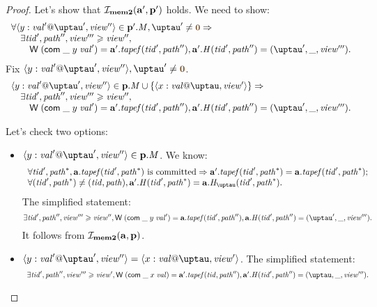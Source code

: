 \begin{proof}
  \noindent
Let's show that $\mathcal{I}_{\rm \bf mem2}(\mathbf{a}', \mathbf{p}')$ holds.
  We need to show:
  \[\begin{array}{l}
  \forall \writeEvt{y}{\stval'}{\tau'}{\R''} \in \p'.\Mprom, \tau' \not = \tstamp{0} => \\
  \quad \exists \tId', \cpath'', \R''' \ge \R'', \\
  \quad \quad \tapeWrite{(\tapeWriteCommitted{\_}{y}{\stval'})} = \aT'.\tapef(\tId', \cpath''),
        \aT'.\hmap(\tId', \cpath'') = (\tau', \_, \R'''). \\
  \end{array}\]
Fix $\writeEvt{y}{\stval'}{\tau'}{\R''}, \tau' \not = \tstamp{0}$. \\
  \[\begin{array}{l}
  \writeEvt{y}{\stval'}{\tau'}{\R''} \in \p.\Mprom \cup \{\writeEvt{x}{\stval}{\tau}{\R'}\} => \\
  \quad \exists \tId', \cpath'', \R''' \ge \R'', \\
  \quad \quad \tapeWrite{(\tapeWriteCommitted{\_}{y}{\stval'})} = \aT'.\tapef(\tId', \cpath''),
        \aT'.\hmap(\tId', \cpath'') = (\tau', \_, \R'''). \\
  \end{array}\]
  
  Let's check two options: \\
  \begin{itemize}
    \item $\writeEvt{y}{\stval'}{\tau'}{\R''} \in \p.\Mprom$. We know:
    \[\begin{array}{l}
      \forall \tId', \cpath^{*}, \aT.\tapef(\tId', \cpath^{*}) \text{ is committed} =>
        \aT'.\tapef(\tId', \cpath^{*}) = \aT.\tapef(\tId', \cpath^{*}); \\
      \forall (\tId', \cpath^{*}) \not = (\tId, \cpath), \aT'.\hmap(\tId', \cpath^{*}) = \aT.\tmap(\tId', \cpath^{*}).
    \end{array}\]
    The simplified statement:
    \[
      \exists \tId', \cpath'', \R''' \ge \R'',
      \tapeWrite{(\tapeWriteCommitted{\_}{y}{\stval'})} = \aT.\tapef(\tId', \cpath''),
      \aT.\hmap(\tId', \cpath'') = (\tau', \_, \R''').
    \]
    It follows from $\mathcal{I}_{\rm \bf mem2}(\mathbf{a}, \mathbf{p})$.

    \item $\writeEvt{y}{\stval'}{\tau'}{\R''} = \writeEvt{x}{\stval}{\tau}{\R'}$. The simplified statement:
      \[\begin{array}{l}
    \exists \tId', \cpath'', \R''' \ge \R',
      \tapeWrite{(\tapeWriteCommitted{\_}{x}{\stval})} = \aT'.\tapef(\tId, \cpath''),
      \aT'.\hmap(\tId', \cpath'') = (\tau, \_, \R'''). \\
      \end{array}\]


\end{itemize}
\end{proof}
